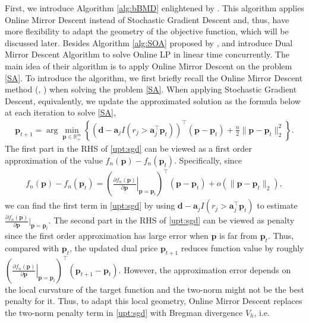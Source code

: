 \documentclass{article} %
\begin{document}
First, we introduce Algorithm \ref{alg:bBMD} enlightened by \cite{balseiro2020dual}. This algorithm applies Online Mirror Descent instead of Stochastic Gradient Descent and, thus, have more flexibility to adapt the geometry of the objective function, which will be discussed later. Besides Algorithm \ref{alg:SOA} proposed by \cite{li2020simple}, \cite{balseiro2020dual} and \cite{balseiro2020best} introduce Dual Mirror Descent Algorithm to solve Online LP in linear time concurrently. The main idea of their algorithm is to apply Online Mirror Descent on the problem \eqref{SA}. To introduce the algorithm, we first briefly recall the Online Mirror Descent method (\cite{hazan2019introduction}, \cite{bubeck2011introduction}) when solving the problem \eqref{SA}. When applying Stochastic Gradient Descent, equivalently, we update the approximated solution as the formula below at each iteration to solve \eqref{SA},
\begin{align}
\label{upt:sgd}
    \bm{p}_{t+1} 
    =
    \arg\min\limits_{\bm{p}\in\mathbb{R}^{m}_{+}} \left\{
        \left(\bm{d}-\bm{a}_jI(r_j>\bm{a}_j^{\top}\bm{p}_t)\right)^{\top}\left(\bm{p}-\bm{p}_t\right)
        +
        \frac{n}{2}\|\bm{p}-\bm{p}_{t}\|_2^2
    \right\}.
\end{align}
The first part in the RHS of \eqref{upt:sgd} can be viewed as a first order approximation of the value $f_n(\bm{p})-f_n(\bm{p}_t)$. Specifically, since
\begin{align*}
    f_n(\bm{p})-f_n(\bm{p}_t)
    =
    \left(\left.\frac{\partial f_n(\bm{p})}{\partial \bm{p}}\right\vert_{\bm{p}=\bm{p}_t}\right)^{\top}\left(\bm{p}-\bm{p}_t\right)+o(\|\bm{p}-\bm{p}_t\|_2),
\end{align*}
we can find the first term in \eqref{upt:sgd} by using $\bm{d}-\bm{a}_jI(r_j>\bm{a}_j^{\top}\bm{p}_t)$ to estimate $\frac{\partial f_n(\bm{p})}{\partial \bm{p}}|_{\bm{p}=\bm{p}_t}$. The second part in the RHS of  \eqref{upt:sgd} can be viewed as penalty since the first order approximation has large error when $\bm{p}$ is far from $\bm{p}_t$. Thus, compared with $\bm{p}_t$, the updated dual price $\bm{p}_{t+1}$ reduces function value by roughly $\left(\left.\frac{\partial f_n(\bm{p})}{\partial \bm{p}}\right\vert_{\bm{p}=\bm{p}_t}\right)^{\top}\left(\bm{p}_{t+1}-\bm{p}_t\right)$. However, the approximation error depends on the local curvature of the target function and the two-norm might not be the best penalty for it. Thus, to adapt this local geometry, Online Mirror Descent replaces the two-norm penalty term in \eqref{upt:sgd} with Bregman divergence $V_h$, i.e.
\end{document}
